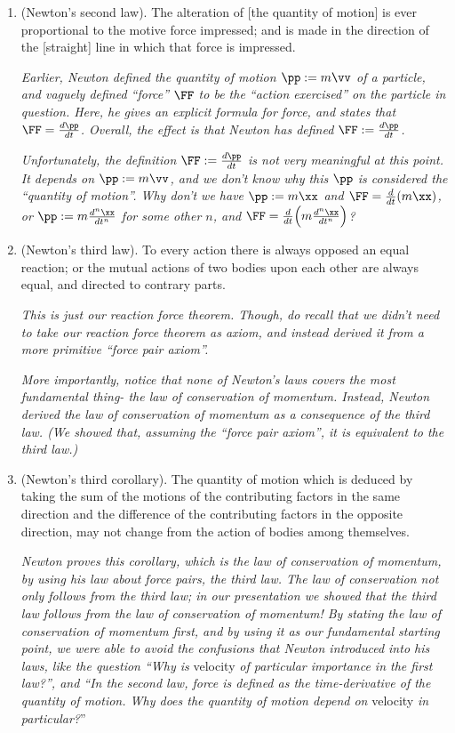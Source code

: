 \documentclass{article}
\begin{document}
\begin{enumerate}
	\item (Newton's second law). The alteration of [the quantity of motion] is ever proportional to the motive force impressed; and is made in the direction of the [straight] line in which that force is impressed.
	
	\textit{Earlier, Newton defined the quantity of motion $\pp := m\vv$ of a particle, and vaguely defined ``force'' $\FF$ to be the ``action exercised'' on the particle in question. Here, he gives an explicit formula for force, and states that $\FF = \frac{d\pp}{dt}$. Overall, the effect is that Newton has defined $\FF := \frac{d\pp}{dt}$.}
	
	\textit{Unfortunately, the definition $\FF := \frac{d\pp}{dt}$ is not very meaningful at this point. It depends on $\pp := m\vv$, and we don't know why this $\pp$ is considered the ``quantity of motion''. Why don't we have $\pp := m\xx$ and $\FF = \frac{d}{dt}(m\xx)$, or $\pp := m\frac{d^n\xx}{dt^n}$ for some other $n$, and $\FF = \frac{d}{dt}\Big(m\frac{d^n\xx}{dt^n}\Big)$?}
	
	\item (Newton's third law). To every action there is always opposed an equal reaction; or the mutual actions of two bodies upon each other are always equal, and directed to contrary parts.
	
	\textit{This is just our reaction force theorem. Though, do recall that we didn't need to take our reaction force theorem as axiom, and instead derived it from a more primitive ``force pair axiom''.}
		
	\textit{More importantly, notice that none of Newton's laws covers the most fundamental thing- the law of conservation of momentum. Instead, Newton derived the law of conservation of momentum as a consequence of the third law. (We showed that, assuming the ``force pair axiom'', it is equivalent to the third law.)}
	
	\item (Newton's third corollary). The quantity of motion which is deduced by taking the sum of the motions of the contributing factors in the same direction and the difference of the contributing factors in
	the opposite direction, may not change from the action of bodies among themselves.
	
	\textit{Newton proves this corollary, which is the law of conservation of momentum, by using his law about force pairs, the third law. The law of conservation not only follows from the third law; in our presentation we showed that the third law follows from the law of conservation of momentum! By stating the law of conservation of momentum first, and by using it as our fundamental starting point, we were able to avoid the confusions that Newton introduced into his laws, like the question ``Why is} velocity \textit{of particular importance in the first law?'', and ``In the second law, force is defined as the time-derivative of the quantity of motion. Why does the quantity of motion depend on} velocity \textit{in particular?}''
\end{enumerate}
\end{document}
